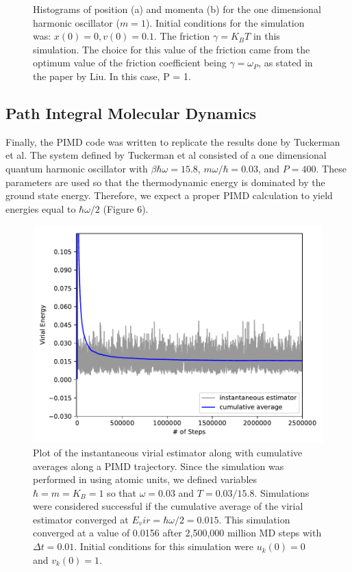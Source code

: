 \documentclass{article}
\begin{document}
\begin{figure}[H]
\begin{subfigure}[b]{0.49\textwidth}
    \end{subfigure}
    \caption{Histograms of position (a) and momenta (b) for the one dimensional harmonic oscillator ($m = 1$). Initial conditions for the simulation was: $x(0) = 0, v(0) = 0.1$. The friction $\gamma = K_B T$ in this simulation. The choice for this value of the friction came from the optimum value of the friction coefficient being $\gamma = \omega_P$, as stated in the paper by Liu.\cite{Liu} In this case, P = 1.}
\end{figure}

\subsection{Path Integral Molecular Dynamics}
Finally, the PIMD code was written to replicate the results done by Tuckerman et al.\cite{tuckerman}
The system defined by Tuckerman et al consisted of a one dimensional quantum harmonic oscillator with $\beta \hbar \omega = 15.8$, $m \omega / \hbar = 0.03$, and $P = 400$.
These parameters are used so that the thermodynamic energy is dominated by the ground state energy.
Therefore, we expect a proper PIMD calculation to yield energies equal to $\hbar \omega / 2$ (Figure 6).

\begin{figure}[H]
  \centering
  \includegraphics[scale=0.7]{Figures/pimd/smallkt.pdf}
    \caption{Plot of the instantaneous virial estimator along with cumulative averages along a PIMD trajectory. Since the simulation was performed in using atomic units, we defined variables $\hbar = m = K_B = 1$ so that $\omega = 0.03$ and $T = 0.03/15.8$. Simulations were considered successful if the cumulative average of the virial estimator converged at $E_vir = \hbar \omega / 2 = 0.015$. This simulation converged at a value of 0.0156 after 2,500,000 million MD steps with $\Delta t = 0.01$. Initial conditions for this simulation were $u_k(0) = 0$ and $v_k(0) = 1$.}
\end{figure}
\end{document}
